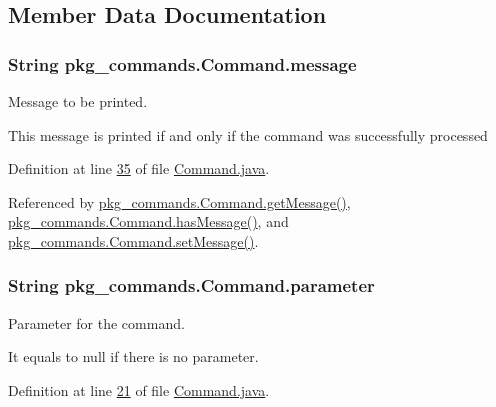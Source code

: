 \subsection{Member Data Documentation}
\hypertarget{classpkg__commands_1_1Command_ab4bc9d76fd948fcf253400793fbfde3f}{
\subsubsection[{message}]{\setlength{\rightskip}{0pt plus 5cm}String pkg\-\_\-commands.\-Command.\-message\hspace{0.3cm}{\ttfamily [private]}}}\label{classpkg__commands_1_1Command_ab4bc9d76fd948fcf253400793fbfde3f}


Message to be printed. 

This message is printed if and only if the command was successfully processed 

Definition at line \hyperlink{Command_8java_source_l00035}{35} of file \hyperlink{Command_8java_source}{Command.\-java}.



Referenced by \hyperlink{Command_8java_source_l00097}{pkg\-\_\-commands.\-Command.\-get\-Message()}, \hyperlink{Command_8java_source_l00105}{pkg\-\_\-commands.\-Command.\-has\-Message()}, and \hyperlink{Command_8java_source_l00089}{pkg\-\_\-commands.\-Command.\-set\-Message()}.

\hypertarget{classpkg__commands_1_1Command_a089fe1b30b43b2ad5f0dcb2f0ffc2fdd}{
\subsubsection[{parameter}]{\setlength{\rightskip}{0pt plus 5cm}String pkg\-\_\-commands.\-Command.\-parameter\hspace{0.3cm}{\ttfamily [private]}}}\label{classpkg__commands_1_1Command_a089fe1b30b43b2ad5f0dcb2f0ffc2fdd}


Parameter for the command. 

It equals to null if there is no parameter. 

Definition at line \hyperlink{Command_8java_source_l00021}{21} of file \hyperlink{Command_8java_source}{Command.\-java}.



